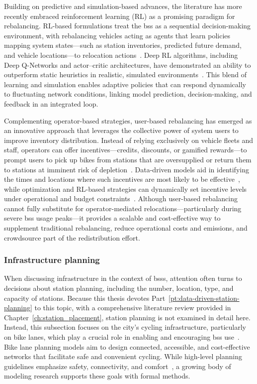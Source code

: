    Building on predictive and simulation-based advances, the literature has more recently embraced reinforcement learning (RL) as a promising paradigm for rebalancing. RL-based formulations treat the \ac{bss} as a sequential decision-making environment, with rebalancing vehicles acting as agents that learn policies mapping system states—such as station inventories, predicted future demand, and vehicle locations—to relocation actions~\cite{Yin2024}. Deep RL algorithms, including Deep Q-Networks and actor–critic architectures, have demonstrated an ability to outperform static heuristics in realistic, simulated environments~\cite{Yin2024, Liang2025}. This blend of learning and simulation enables adaptive policies that can respond dynamically to fluctuating network conditions, linking model prediction, decision-making, and feedback in an integrated loop.

    Complementing operator-based strategies, user-based rebalancing has emerged as an innovative approach that leverages the collective power of system users to improve inventory distribution. Instead of relying exclusively on vehicle fleets and staff, operators can offer incentives—credits, discounts, or gamified rewards—to prompt users to pick up bikes from stations that are oversupplied or return them to stations at imminent risk of depletion~\cite{Fukushige2022, Chiariotti2020}. Data-driven models aid in identifying the times and locations where such incentives are most likely to be effective~\cite{Chiariotti2020}, while optimization and RL-based strategies can dynamically set incentive levels under operational and budget constraints~\cite{Cheng2021, Pan2019}. Although user-based rebalancing cannot fully substitute for operator-mediated relocations—particularly during severe \ac{bss} usage peaks—it provides a scalable and cost-effective way to supplement traditional rebalancing, reduce operational costs and emissions, and crowdsource part of the redistribution effort.

    
    \subsubsection{Infrastructure planning}

    When discussing infrastructure in the context of \acp{bss}, attention often turns to decisions about station planning, including the number, location, type, and capacity of stations. Because this thesis devotes Part~\ref{pt:data-driven-station-planning} to this topic, with a comprehensive literature review provided in Chapter~\ref{ch:station_placement}, station planning is not examined in detail here. Instead, this subsection focuses on the city’s cycling infrastructure, particularly on bike lanes, which play a crucial role in enabling and encouraging \ac{bss} use~\cite{Moran2025, Otero2018}. Bike lane planning models aim to design connected, accessible, and cost-effective networks that facilitate safe and convenient cycling. While high-level planning guidelines emphasize safety, connectivity, and comfort~\cite{Yanocha2018}, a growing body of modeling research supports these goals with formal methods.

